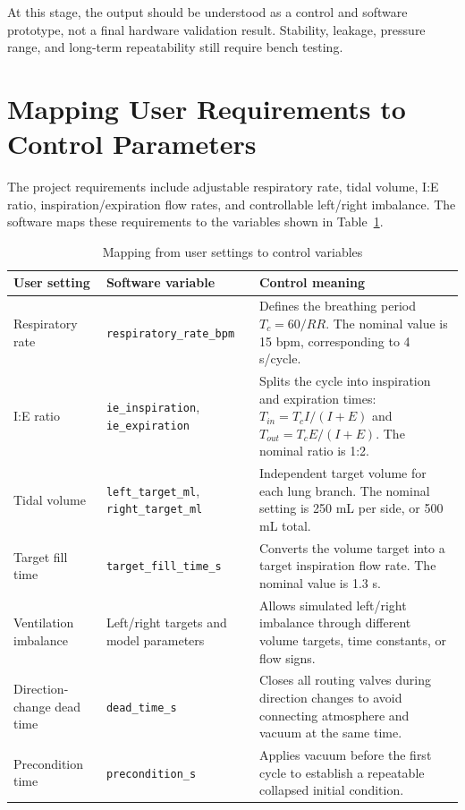 \documentclass[11pt,a4paper]{article}
\begin{document}
At this stage, the output should be understood as a control and software prototype, not a final hardware validation result. Stability, leakage, pressure range, and long-term repeatability still require bench testing.

\section{Mapping User Requirements to Control Parameters}

The project requirements include adjustable respiratory rate, tidal volume, I:E ratio, inspiration/expiration flow rates, and controllable left/right imbalance. The software maps these requirements to the variables shown in Table~\ref{tab:param-map}.

\begin{table}[H]
\centering
\caption{Mapping from user settings to control variables}
\label{tab:param-map}
\begin{tabularx}{\textwidth}{
  >{\raggedright\arraybackslash}p{3.4cm}
  >{\raggedright\arraybackslash}p{4.5cm}
  X
}
\toprule
\textbf{User setting} & \textbf{Software variable} & \textbf{Control meaning} \\
\midrule
Respiratory rate & \texttt{respiratory\_rate\_bpm} & Defines the breathing period $T_c=60/RR$. The nominal value is 15 bpm, corresponding to 4 s/cycle. \\
I:E ratio & \texttt{ie\_inspiration}, \texttt{ie\_expiration} & Splits the cycle into inspiration and expiration times: $T_{in}=T_c I/(I+E)$ and $T_{out}=T_c E/(I+E)$. The nominal ratio is 1:2. \\
Tidal volume & \texttt{left\_target\_ml}, \texttt{right\_target\_ml} & Independent target volume for each lung branch. The nominal setting is 250 mL per side, or 500 mL total. \\
Target fill time & \texttt{target\_fill\_time\_s} & Converts the volume target into a target inspiration flow rate. The nominal value is 1.3 s. \\
Ventilation imbalance & Left/right targets and model parameters & Allows simulated left/right imbalance through different volume targets, time constants, or flow signs. \\
Direction-change dead time & \texttt{dead\_time\_s} & Closes all routing valves during direction changes to avoid connecting atmosphere and vacuum at the same time. \\
Precondition time & \texttt{precondition\_s} & Applies vacuum before the first cycle to establish a repeatable collapsed initial condition. \\
\bottomrule
\end{tabularx}
\end{table}
\end{document}
